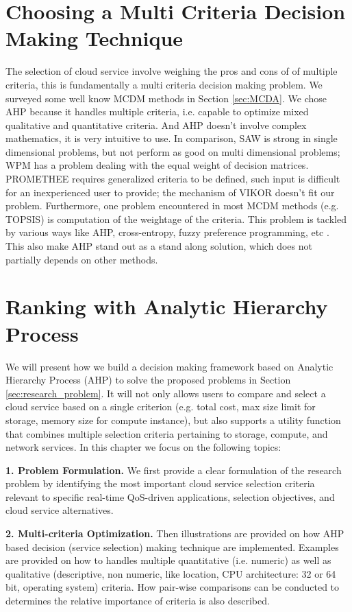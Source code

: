 \section{Choosing a Multi Criteria Decision Making Technique}
The selection of cloud service involve weighing the pros and cons of
of multiple criteria,
this is fundamentally a multi criteria decision making problem.
We surveyed some well know MCDM methods in Section \ref{sec:MCDA}.
We chose AHP because it handles multiple criteria,
i.e. capable to optimize mixed qualitative and quantitative criteria.
And AHP doesn't involve complex mathematics, it is very intuitive to use.
In comparison, SAW is strong in single dimensional problems, but not perform as 
good on multi dimensional problems; WPM has a problem dealing with the equal weight of decision matrices. PROMETHEE requires generalized criteria to be defined, such input is difficult for an inexperienced user to provide; the mechanism of VIKOR doesn't fit our problem. 
Furthermore, one problem encountered in most MCDM methods (e.g. TOPSIS) is computation of the weightage of the criteria. This problem is tackled by various ways like AHP, cross-entropy, fuzzy preference programming, etc \cite{AHPvsTOPSIS}.
This also make AHP stand out as a stand along solution, which does not partially depends on other methods.

\section{Ranking with Analytic Hierarchy Process}
We will present how we build a decision making framework based on Analytic Hierarchy Process (AHP) to solve the proposed problems in Section \ref{sec:research_problem}.
It will not only allows users to compare and select a cloud service based on a single criterion (e.g. total cost, max size limit for storage, memory size for compute instance), but also supports a utility function that combines multiple selection criteria pertaining to storage, compute, and network services.
In this chapter we focus on the following topics:

\textbf{1. Problem Formulation.} We first provide a clear formulation of the research problem by identifying the most important cloud service selection criteria relevant to specific real-time QoS-driven applications, selection objectives, and cloud service alternatives.

\textbf{2. Multi-criteria Optimization.} Then illustrations are provided on how AHP based decision (service selection) making technique are implemented. Examples are provided on how to handles multiple quantitative (i.e. numeric) as well as qualitative (descriptive, non numeric, like location, CPU architecture: 32 or 64 bit, operating system) criteria. How pair-wise comparisons can be conducted to determines the relative importance of criteria is also described.


